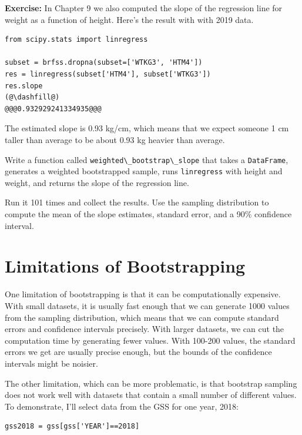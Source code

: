 \textbf{Exercise:} In Chapter 9 we also computed the slope of the
regression line for weight as a function of height. Here's the result
with with 2019 data.

\begin{lstlisting}[]
from scipy.stats import linregress

subset = brfss.dropna(subset=['WTKG3', 'HTM4'])
res = linregress(subset['HTM4'], subset['WTKG3'])
res.slope
(@\dashfill@)
@@@0.932929241334935@@@
\end{lstlisting}

The estimated slope is 0.93 kg/cm, which means that we expect someone 1
cm taller than average to be about 0.93 kg heavier than average.

Write a function called
\passthrough{\lstinline!weighted\_bootstrap\_slope!} that takes a
\passthrough{\lstinline!DataFrame!}, generates a weighted bootstrapped
sample, runs \passthrough{\lstinline!linregress!} with height and
weight, and returns the slope of the regression line.

Run it 101 times and collect the results. Use the sampling distribution
to compute the mean of the slope estimates, standard error, and a 90\%
confidence interval.

\hypertarget{limitations-of-bootstrapping}{%
\section{Limitations of
Bootstrapping}\label{limitations-of-bootstrapping}}

One limitation of bootstrapping is that it can be computationally
expensive. With small datasets, it is usually fast enough that we can
generate 1000 values from the sampling distribution, which means that we
can compute standard errors and confidence intervals precisely. With
larger datasets, we can cut the computation time by generating fewer
values. With 100-200 values, the standard errors we get are usually
precise enough, but the bounds of the confidence intervals might be
noisier.

The other limitation, which can be more problematic, is that bootstrap
sampling does not work well with datasets that contain a small number of
different values. To demonstrate, I'll select data from the GSS for one
year, 2018:

\begin{lstlisting}[]
gss2018 = gss[gss['YEAR']==2018]
\end{lstlisting}

